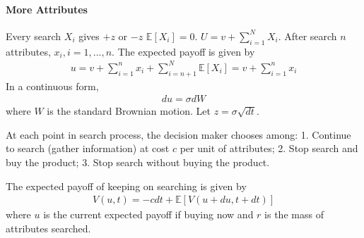 \documentclass[11pt]{elegantbook}
\begin{document}
\paragraph*{More Attributes}
Every search $X_i$ gives $+z$ or $-z$ $\mathbb{E}[X_i]=0$. $U=v+\sum_{i=1}^N X_i$.
After search $n$ attributes, $x_i,i=1,...,n$. The expected payoff is given by
\begin{equation}
    \begin{aligned}
        u=v+\sum_{i=1}^n x_i + \sum_{i=n+1}^N \mathbb{E}[X_i]=v+\sum_{i=1}^n x_i
    \end{aligned}
    \nonumber
\end{equation}
In a continuous form,
\begin{equation}
    \begin{aligned}
        d u=\sigma dW
    \end{aligned}
    \nonumber
\end{equation}
where $W$ is the standard Brownian motion. Let $z=\sigma\sqrt{dt}$.

At each point in search process, the decision maker chooses among: 1. Continue to search (gather information) at cost $c$ per unit of attributes; 2. Stop search and buy the product; 3. Stop search without buying the product.

The expected payoff of keeping on searching is given by
\begin{equation}
    \begin{aligned}
        V(u,t)=-cdt+\mathbb{E}[V(u+du,t+dt)]
    \end{aligned}
    \nonumber
\end{equation}
where $u$ is the current expected payoff if buying now and $r$ is the mass of attributes searched.
\end{document}
